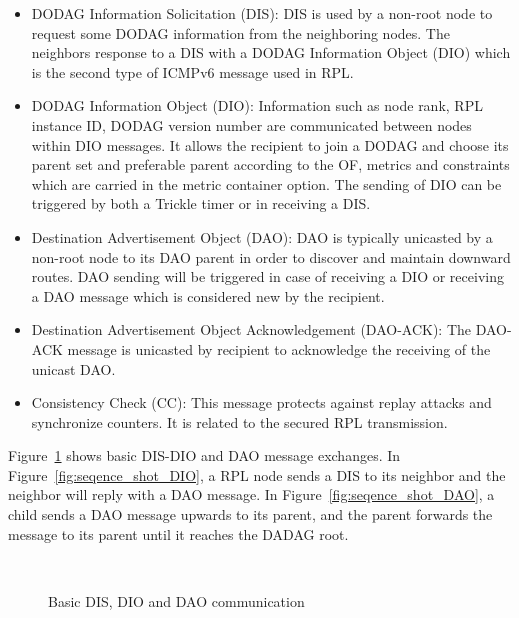 \begin{itemize}
\item DODAG Information Solicitation (DIS): DIS is used by a non-root node to request some DODAG information from the neighboring nodes. The neighbors response to a DIS with a DODAG Information Object (DIO) which is the second type of ICMPv6 message used in RPL.
\newline

\item DODAG Information Object (DIO): Information such as node rank, RPL instance ID, DODAG version number are communicated between nodes within DIO messages. It allows the recipient to join a DODAG and choose its parent set and preferable parent according to the OF, metrics and constraints which are carried in the metric container option. The sending of DIO can be triggered by both a Trickle timer or in receiving a DIS.
\newline

\item Destination Advertisement Object (DAO): DAO is typically unicasted by a non-root node to its DAO parent in order to discover and maintain downward routes. DAO sending will be triggered in case of receiving a DIO or receiving a DAO message which is considered new by the recipient.
\newline

\item Destination Advertisement Object Acknowledgement (DAO-ACK): The DAO-ACK message is unicasted by recipient to acknowledge the receiving of the unicast DAO.
\newline

\item Consistency Check (CC): This message protects against replay attacks and synchronize counters. It is related to the secured RPL transmission.
\end{itemize}
\newline

Figure~\ref{fig:DIS/DIO/DAO} shows basic DIS-DIO and DAO message exchanges. In Figure~\ref{fig:seqence_shot_DIO}, a RPL node sends a DIS to its neighbor and the neighbor will reply with a DAO message. In Figure~\ref{fig:seqence_shot_DAO}, a child sends a DAO message upwards to its parent, and the parent forwards the message to its parent until it reaches the DADAG root.  

\begin{figure}[htbp]
  \begin{center}
    \leavevmode
    \\
    \caption{Basic DIS, DIO and DAO communication}
    \label{fig:DIS/DIO/DAO}
  \end{center}
\end{figure}

